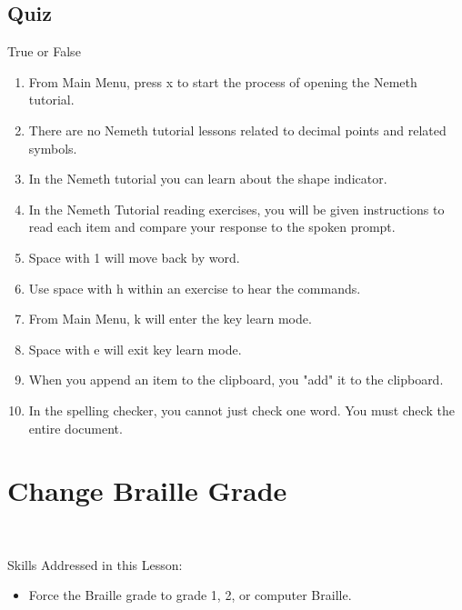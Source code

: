 \documentclass[10pt,letterpaper,twoside]{report}
\begin{document}
{{{\subsection{Quiz}
True or False

\begin{enumerate}
	\item From Main Menu, press x to start the process of opening the Nemeth tutorial.
	\item There are no Nemeth tutorial lessons related to decimal points and related symbols.
	\item In the Nemeth tutorial you can learn about the shape indicator.
	\item In the Nemeth Tutorial reading exercises, you will be given instructions to read each item and compare your response to the spoken prompt.
	\item Space with 1 will move back by word.
	\item Use space with h within an exercise to hear the commands.
	\item From Main Menu, k will enter the key learn mode.
	\item Space with e will exit key learn mode.
	\item When you append an item to the clipboard, you "add" it to the clipboard.
	\item In the spelling checker, you cannot just check one word.  You must check the entire document.
\end{enumerate}

\clearpage

\section{ Change Braille Grade}
\


Skills Addressed in this Lesson:
\begin{itemize}
	\item Force the Braille grade to grade 1, 2, or computer Braille.
\end{itemize}

}}}
\end{document}
